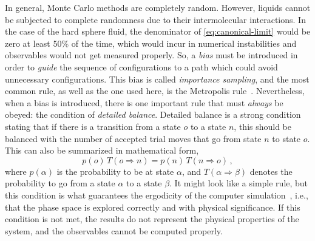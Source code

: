 In general, Monte Carlo methods are completely random. However, liquids cannot be
subjected to complete randomness due to their intermolecular interactions. In the case
of the hard sphere fluid, the denominator of \autoref{eq:canonical-limit} would be zero
at least 50\% of the time, which would incur in numerical instabilities and observables
would not get measured properly. So, a \emph{bias} must be introduced in order to
\emph{guide} the sequence of configurations to a path which could avoid unnecessary
configurations. This bias is called \emph{importance sampling}, and the most common rule,
as well as the one used here, is the Metropolis rule~\cite{landauGuideMonteCarlo2021}.
Nevertheless, when a bias is introduced, there is one important rule that must
\emph{always} be obeyed: the condition of \emph{detailed balance}. Detailed balance
is a strong condition stating that if there is a transition from a state $o$ to a
state $n$, this should be balanced with the number of accepted trial moves that go
from state $n$ to state $o$. This can also be summarized in mathematical form,
\begin{equation}
    p(o) \, T(o \Longrightarrow n) = p(n) \, T(n \Longrightarrow o) \, ,
    \label{eq:detailed-balance}
\end{equation}
where $p(\alpha)$ is the probability to be at state $\alpha$, and 
$T(\alpha \Longrightarrow \beta)$ denotes the probability to go from a state 
$\alpha$ to a state $\beta$. It might look like a simple rule, but this condition
is what guarantees the ergodicity of the computer
simulation~\cite{landauGuideMonteCarlo2021}, i.e., that the phase space is explored
correctly and with physical significance. If this condition is not met, the results
do not represent the physical properties of the system, and the observables cannot
be computed properly.

